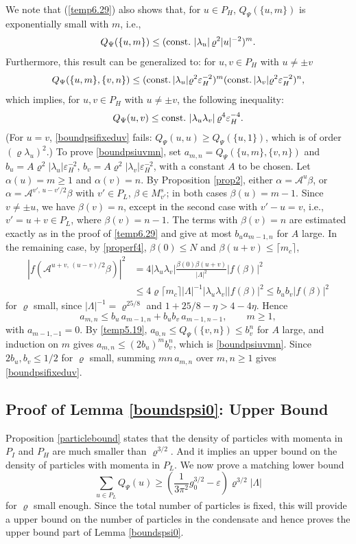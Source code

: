 \documentclass[11pt]{article}
\numberwithin{equation}{section}
\newcommand{\beq}{\begin{equation}}
\newcommand{\eeq}{\end{equation}}
\newcommand\eps{\varepsilon}
\newcommand\const{{\rm const.\, }}
\newcommand\al{{\alpha}}
\newcommand\be{\beta}
\renewcommand\rho\varrho
\theoremstyle{definition}
\begin{document}
We note that (\ref{temp6.29}) also shows that, for $u\in P_H$, $ Q_\Psi(\{u,m\})$ is exponentially small with $m$, i.e.,
\beq\label{temp5.19}
 Q_\Psi(\{u,m\})\leq (\const \left|\lambda_u\right|\rho^2|u|^{-2})^m.
\eeq
Furthermore, this result can be generalized to: for $u,v\in P_H$ with $u\neq \pm v$
\beq\label{boundpsiuvmn}
 Q_\Psi(\{u,m\},\{v,n\})\leq (\const |\lambda_u|\rho^2\eps_H^{-2})^m(\const |\lambda_v|\rho^2\eps_H^{-2})^n,
\eeq
which implies, for  $u,v\in P_H$ with $u\neq\pm v$, the following inequality:
\beq\label{boundpsifixeduv}
 Q_\Psi(u,v)\leq \const \left|\lambda_u\lambda_v\right|\rho^4\eps_H^{-4}.
\eeq
(For $u=v$, \eqref{boundpsifixeduv} fails: $Q_\Psi(u,u)\geq Q_\Psi(\{u,1\})$, which is of order $(\rho\lambda_u)^2$.)
To prove \eqref{boundpsiuvmn}, set $a_{m,n}=Q_\Psi(\{u,m\},\{v,n\})$ and $b_u=A\rho^2|\lambda_u|\eps_H^{-2}$, $b_v=A\rho^2|\lambda_v|\eps_H^{-2}$, with a constant $A$ to be chosen. Let $\al(u)=m\geq1$ and $\al(v)=n$. By Proposition \ref{prop2}, either $\al=\mathcal A^u\be$, or $\al=\mathcal A^{v',\,u-v'/2}\be$ with $v'\in P_L$, $\be\in M^s_{v'}$; in both cases $\be(u)=m-1$. Since $v\neq\pm u$, we have $\be(v)=n$, except in the second case with $v'-u=v$, i.e., $v'=u+v\in P_L$, where $\be(v)=n-1$. The terms with $\be(v)=n$ are estimated exactly as in the proof of \eqref{temp6.29} and give at most $b_u a_{m-1,n}$ for $A$ large. In the remaining case, by \eqref{properf4}, $\be(0)\leq N$ and $\be(u+v)\leq\lceil m_c\rceil$,
\begin{align*}
|f(\mathcal A^{u+v,\,(u-v)/2}\be)|^2&=4|\lambda_u\lambda_v|\frac{\be(0)\be(u+v)}{|\Lambda|^2}|f(\be)|^2\\
&\leq 4\rho\lceil m_c\rceil|\Lambda|^{-1}|\lambda_u\lambda_v||f(\be)|^2\leq b_ub_v|f(\be)|^2
\end{align*}
for $\rho$ small, since $|\Lambda|^{-1}=\rho^{25/8}$ and $1+25/8-\eta>4-4\eta$. Hence
\[
a_{m,n}\leq b_u\,a_{m-1,n}+b_ub_v\,a_{m-1,n-1},\qquad m\geq1,
\]
with $a_{m-1,-1}=0$. By \eqref{temp5.19}, $a_{0,n}\leq Q_\Psi(\{v,n\})\leq b_v^n$ for $A$ large, and induction on $m$ gives $a_{m,n}\leq(2b_u)^mb_v^n$, which is \eqref{boundpsiuvmn}. Since $2b_u,b_v\leq 1/2$ for $\rho$ small, summing $mn\,a_{m,n}$ over $m,n\geq1$ gives \eqref{boundpsifixeduv}.


\subsection{Proof of Lemma \ref{boundspsi0}: Upper Bound}


Proposition \ref{particlebound} states that  the density  of particles with momenta in $P_{I}$ and $P_{H}$ are much smaller than $\rho^{3/2}$. And it  implies  
an upper bound on the density  of particles with momenta in $P_{L}$.  We now prove a matching lower bound
\beq\label{upt01}
\sum_{u\in P_L} Q_\Psi(u)\geq \left(\frac{1}{3\pi^2}g^{3/2}_0-\eps\right)\rho^{3/2}|\Lambda|
\eeq
for $\rho$  small enough. Since the total number of particles is fixed, this will provide a upper bound on the number of particles in the condensate and hence proves the upper bound part of Lemma \ref{boundspsi0}.
\end{document}

